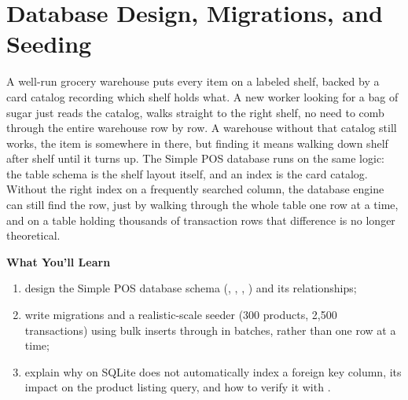 
\chapter{Database Design, Migrations, and Seeding}
\label{ch:desain-basis-data}


A well-run grocery warehouse puts every item on a labeled shelf, backed
by a card catalog recording which shelf holds what. A new worker
looking for a bag of sugar just reads the catalog, walks straight to the
right shelf, no need to comb through the entire warehouse row by row.
A warehouse without that catalog still works, the item is somewhere in
there, but finding it means walking down shelf after shelf until it
turns up. The Simple POS database runs on the same logic: the table
schema is the shelf layout itself, and an index is the card catalog.
Without the right index on a frequently searched column, the database
engine can still find the row, just by walking through the whole table
one row at a time, and on a table holding thousands of transaction rows
that difference is no longer theoretical.

\textbf{What You'll Learn}

\begin{enumerate}
  \item design the Simple POS database schema (, , , ) and its relationships;
  \item write migrations and a realistic-scale seeder (300 products, 2,500 transactions) using bulk inserts through  in batches, rather than  one row at a time;
  \item explain why  on SQLite does not automatically index a foreign key column, its impact on the product listing query, and how to verify it with .
\end{enumerate}

